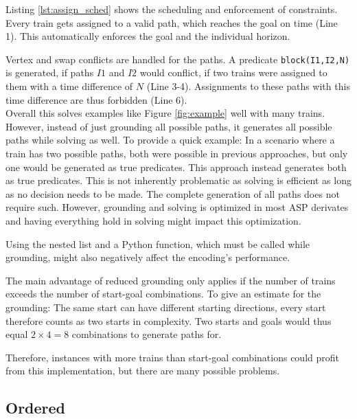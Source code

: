 \documentclass{llncs}
\begin{document}
\begin{multicols*}{2}
Listing \ref{lst:assign_sched} shows the scheduling and enforcement of constraints. Every train gets assigned to a valid path, which reaches the goal on time (Line 1). This automatically enforces the goal and the individual horizon. 

Vertex and swap conflicts are handled for the paths. A predicate \texttt{block(I1,I2,N)} is generated, if paths $\mathit{I1}$ and $\mathit{I2}$ would conflict, if two trains were assigned to them with a time difference of $N$ (Line 3-4). Assignments to these paths with this time difference are thus forbidden (Line 6).\\

Overall this solves examples like Figure \ref{fig:example} well with many trains. However, instead of just grounding all possible paths, it generates all possible paths while solving as well. To provide a quick example: In a scenario where a train has two possible paths, both were possible in previous approaches, but only one would be generated as true predicates. This approach instead generates both as true predicates. This is not inherently problematic as solving is efficient as long as no decision needs to be made. The complete generation of all paths does not require such. However, grounding and solving is optimized in most ASP derivates and having everything hold in solving might impact this optimization.

Using the nested list and a Python function, which must be called while grounding, might also negatively affect the encoding's performance.

The main advantage of reduced grounding only applies if the number of trains exceeds the number of start-goal combinations. To give an estimate for the grounding: The same start can have different starting directions, every start therefore counts as two starts in complexity. Two starts and goals would thus equal $2 \times 4 = 8$ combinations to generate paths for.

Therefore, instances with more trains than start-goal combinations could profit from this implementation, but there are many possible problems.

\subsection*{Ordered}
\begin{figure}[t]
    
    
\end{figure}
\begin{figure}[b]
    \begin{minipage}[b]{0.39\textwidth}
        \centering
\end{minipage}
\end{figure}
\end{multicols*}
\end{document}
